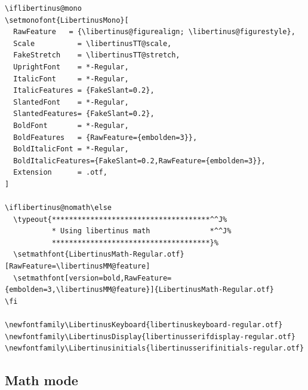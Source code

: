 \documentclass[ngerman,spanish,polish,english,a4paper]{article}
\begin{document}
\begin{verbatim}
\iflibertinus@mono
\setmonofont{LibertinusMono}[ 
  RawFeature   = {\libertinus@figurealign; \libertinus@figurestyle},
  Scale          = \libertinusTT@scale,
  FakeStretch    = \libertinusTT@stretch,
  UprightFont    = *-Regular,
  ItalicFont     = *-Regular,
  ItalicFeatures = {FakeSlant=0.2},
  SlantedFont    = *-Regular,
  SlantedFeatures= {FakeSlant=0.2},
  BoldFont       = *-Regular,
  BoldFeatures   = {RawFeature={embolden=3}},
  BoldItalicFont = *-Regular,
  BoldItalicFeatures={FakeSlant=0.2,RawFeature={embolden=3}},
  Extension      = .otf, 
]

\iflibertinus@nomath\else
  \typeout{*************************************^^J%
           * Using libertinus math              *^^J%
           *************************************}%
  \setmathfont{LibertinusMath-Regular.otf}[RawFeature=\libertinusMM@feature]
  \setmathfont[version=bold,RawFeature={embolden=3,\libertinusMM@feature}]{LibertinusMath-Regular.otf}
\fi

\newfontfamily\LibertinusKeyboard{libertinuskeyboard-regular.otf}
\newfontfamily\LibertinusDisplay{libertinusserifdisplay-regular.otf}
\newfontfamily\Libertinusinitials{libertinusserifinitials-regular.otf}
\end{verbatim}


\subsection{Math mode}
\end{document}
